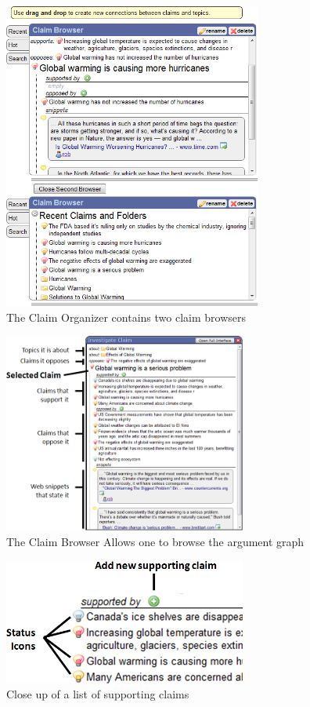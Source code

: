 \documentclass{chi2009}
\begin{document}
\begin{figure}[tb]
	\includegraphics[width=8.5cm]{../screenshots/claimbrowse.png}
	\caption{The Claim Organizer contains two claim browsers}
	\label{fig:claimbrowser}
\end{figure}

\begin{figure}[tb]
	\begin{center}
	\includegraphics[width=8cm]{../screenshots/claimbrowse_diagram.png}
	\caption{The Claim Browser Allows one to browse the argument graph}
	\label{claimbrowse_diagram}
	\end{center}
\end{figure}

\begin{figure}[tb]
	\begin{center}
	\includegraphics[width=8cm]{../screenshots/claimbrowse_zoom.png}
	\caption{Close up of a list of supporting claims}
	\label{claimbrowse_zoom}
	\end{center}
\end{figure}
\end{document}
